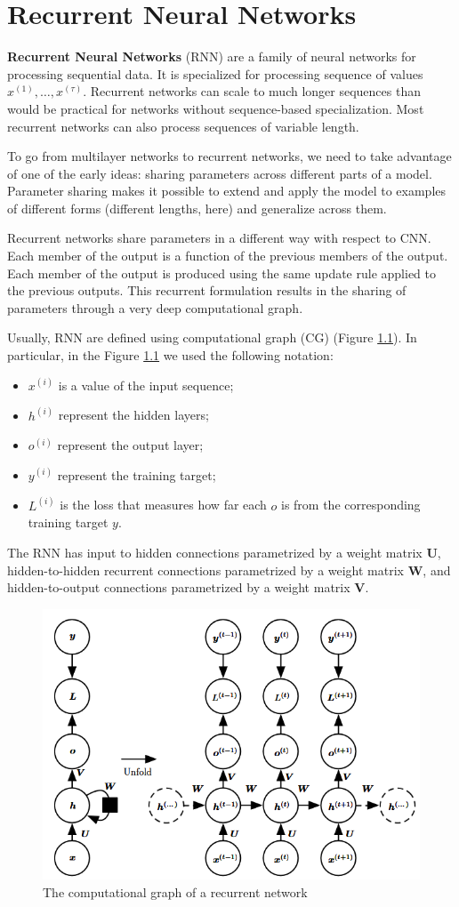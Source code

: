 \chapter{Recurrent Neural Networks}
\textbf{Recurrent Neural Networks} (RNN) are a family of neural networks for processing sequential data. 
It is specialized for processing sequence of values $x^{(1)}, \dots, x^{(\tau)}$. Recurrent networks 
can scale to much longer sequences than would be practical for networks without sequence-based 
specialization. Most recurrent networks can also process sequences of variable length.

To go from multilayer networks to recurrent networks, we need to take advantage of one of the early 
ideas: sharing parameters across different parts of a model. Parameter sharing makes it possible to 
extend and apply the model to examples of different forms (different lengths, here) and generalize 
across them.

Recurrent networks share parameters in a different way with respect to CNN. Each member of the output
is a function of the previous members of the output. Each member of the output is produced using 
the same update rule applied to the previous outputs. This recurrent formulation results in the 
sharing of parameters through a very deep computational graph.

Usually, RNN are defined using computational graph (CG) (Figure \ref{fig:rnn}). In particular, in 
the Figure \ref{fig:rnn} we used the following notation:
\begin{itemize}
    \item $x^{(i)}$ is a value of the input sequence;
    \item $h^{(i)}$ represent the hidden layers;
    \item $o^{(i)}$ represent the output layer;
    \item $y^{(i)}$ represent the training target;
    \item $L^{(i)}$ is the loss that measures how far each $o$ is from the corresponding training 
        target $y$.
\end{itemize}
The RNN has input to hidden connections parametrized by a weight matrix $\textbf{U}$, 
hidden-to-hidden recurrent connections parametrized by a weight matrix $\textbf{W}$, and 
hidden-to-output connections parametrized by a weight matrix $\textbf{V}$.

\begin{figure}[!ht]
    \centering
    \includegraphics[width=0.5\linewidth]{img/RNN/RNN.png}
    \caption{The computational graph of a recurrent network}
    \label{fig:rnn}
\end{figure}

